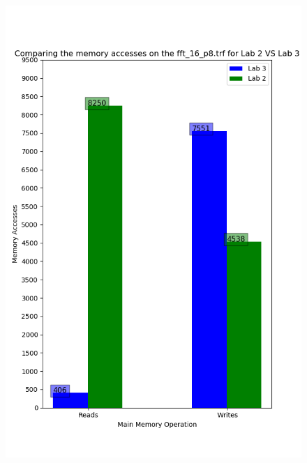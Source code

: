 \documentclass[]{article}
\begin{document}
\begin{figure}[H]
	\includegraphics[scale=0.7]{lab2v3.png}
\end{figure}
\end{document}
